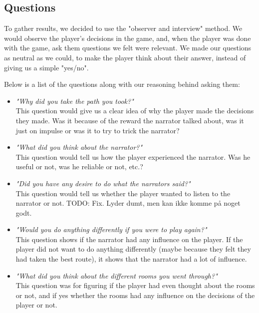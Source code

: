 \subsection{Questions}
\label{Method_Questions}

To gather results, we decided to use the "observer and interview" method. We would observe the player's decisions in the game, and, when the player was done with the game, ask them questions we felt were relevant. We made our questions as neutral as we could, to make the player think about their answer, instead of giving us a simple "yes/no".

Below is a list of the questions along with our reasoning behind asking them:

\begin{itemize}

	\item \textit{"Why did you take the path you took?"} \\
 		This question would give us a clear idea of why the player made the decisions they made. Was it because of the reward the narrator talked about, was it just on impulse or was it to try to trick the narrator? \\

	\item \textit{"What did you think about the narrator?"} \\
		 This question would tell us how the player experienced the narrator. Was he useful or not, was he reliable or not, etc.? \\

	\item \textit{"Did you have any desire to do what the narrators said?"} \\
		 This question would tell us whether the player wanted to listen to the narrator or not. TODO: Fix. Lyder dumt, men kan ikke komme på noget godt. \\

	\item \textit{"Would you do anything differently if you were to play again?"} \\
		 This question shows if the narrator had any influence on the player. If the player did not want to do anything differently (maybe because they felt they had taken the best route), it shows that the narrator had a lot of influence. \\

	\item \textit{"What did you think about the different rooms you went through?"} \\
		 This question was for figuring if the player had even thought about the rooms or not, and if yes whether the rooms had any influence on the decisions of the player or not. \\


\end{itemize}
